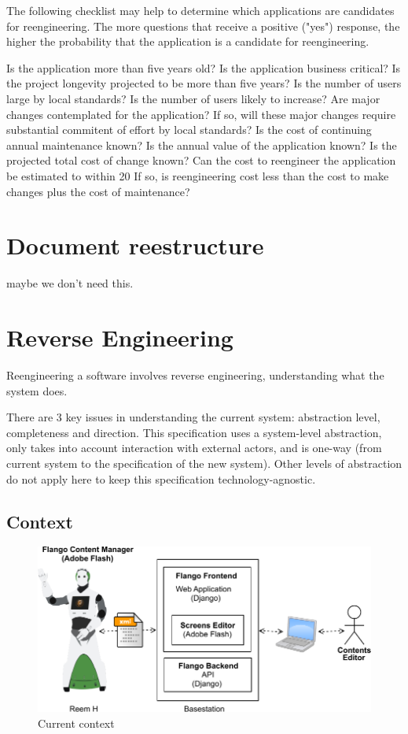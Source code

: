     
    The following checklist may help to determine which applications are candidates for reengineering. The more questions that receive a positive ("yes") response, the higher the probability that the application is a candidate for reengineering.

    Is the application more than five years old?
    Is the application business critical?
    Is the project longevity projected to be more than five years?
    Is the number of users large by local standards?
    Is the number of users likely to increase?
    Are major changes contemplated for the application?
    If so, will these major changes require substantial commitent of effort by local standards?
    Is the cost of continuing annual maintenance known?
    Is the annual value of the application known?
    Is the projected total cost of change known?
    Can the cost to reengineer the application be estimated to within 20%
    If so, is reengineering cost less than the cost to make changes plus the cost of maintenance?

\section{Document reestructure}
maybe we don't need this.

\section{Reverse Engineering}
\label{sec:context}
Reengineering a software involves reverse engineering, understanding what the system does.

There are 3 key issues in understanding the current system: abstraction level, completeness and direction.
This specification uses a system-level abstraction, only takes into account interaction with external actors, and is one-way (from current system to the specification of the new system).
Other levels of abstraction do not apply here to keep this specification technology-agnostic.

\subsection{Context}
\begin{figure}[htb]
    \label{fig:context-original}
    \centering
    \includegraphics[width=\textwidth]{figures/context-original}
    \caption{Current context}
\end{figure}

